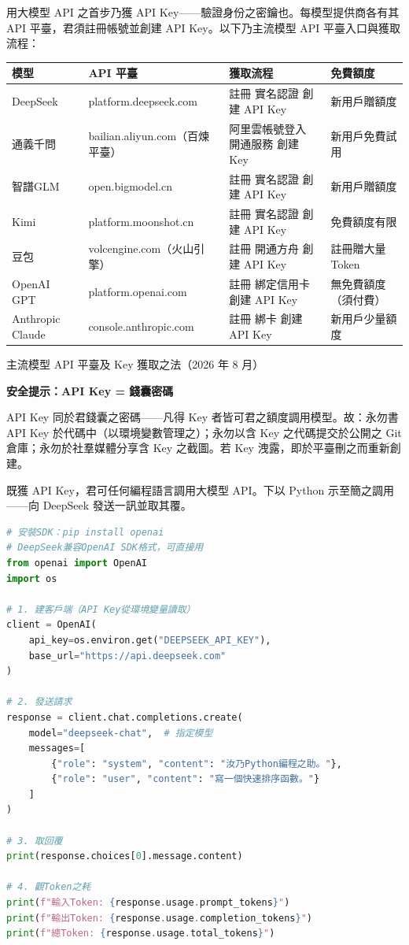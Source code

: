 
用大模型 API 之首步乃獲 API Key——驗證身份之密鑰也。每模型提供商各有其 API 平臺，君須註冊帳號並創建 API Key。以下乃主流模型 API 平臺入口與獲取流程：

\begin{center}
\begin{tabularx}{\linewidth}{|X|X|X|X|}
\hline
\textbf{模型} & \textbf{API 平臺} & \textbf{獲取流程} & \textbf{免費額度} \tabularnewline
\hline
DeepSeek & platform.deepseek.com & 註冊 實名認證 創建 API Key & 新用戶贈額度 \tabularnewline
通義千問 & bailian.aliyun.com（百煉平臺） & 阿里雲帳號登入 開通服務 創建 Key & 新用戶免費試用 \tabularnewline
智譜GLM & open.bigmodel.cn & 註冊 實名認證 創建 API Key & 新用戶贈額度 \tabularnewline
Kimi & platform.moonshot.cn & 註冊 實名認證 創建 API Key & 免費額度有限 \tabularnewline
豆包 & volcengine.com（火山引擎） & 註冊 開通方舟 創建 API Key & 註冊贈大量 Token \tabularnewline
OpenAI GPT & platform.openai.com & 註冊 綁定信用卡 創建 API Key & 無免費額度（須付費） \tabularnewline
Anthropic Claude & console.anthropic.com & 註冊 綁卡 創建 API Key & 新用戶少量額度 \tabularnewline
\hline
\end{tabularx}
\end{center}

\begin{center}\small\color{gray}主流模型 API 平臺及 Key 獲取之法（2026 年 8 月）\end{center}

\textbf{安全提示：API Key = 錢囊密碼}\par

API Key 同於君錢囊之密碼——凡得 Key 者皆可君之額度調用模型。故：永勿書 API Key 於代碼中（以環境變數管理之）；永勿以含 Key 之代碼提交於公開之 Git 倉庫；永勿於社羣媒體分享含 Key 之截圖。若 Key 洩露，即於平臺刪之而重新創建。


既獲 API Key，君可任何編程語言調用大模型 API。下以 Python 示至簡之調用——向 DeepSeek 發送一訊並取其覆。

\begin{lstlisting}[language=Python]
# 安裝SDK：pip install openai
# DeepSeek兼容OpenAI SDK格式，可直接用
from openai import OpenAI
import os

# 1. 建客戶端（API Key從環境變量讀取）
client = OpenAI(
    api_key=os.environ.get("DEEPSEEK_API_KEY"),
    base_url="https://api.deepseek.com"
)

# 2. 發送請求
response = client.chat.completions.create(
    model="deepseek-chat",  # 指定模型
    messages=[
        {"role": "system", "content": "汝乃Python編程之助。"},
        {"role": "user", "content": "寫一個快速排序函數。"}
    ]
)

# 3. 取回覆
print(response.choices[0].message.content)

# 4. 觀Token之耗
print(f"輸入Token: {response.usage.prompt_tokens}")
print(f"輸出Token: {response.usage.completion_tokens}")
print(f"總Token: {response.usage.total_tokens}")
\end{lstlisting}

